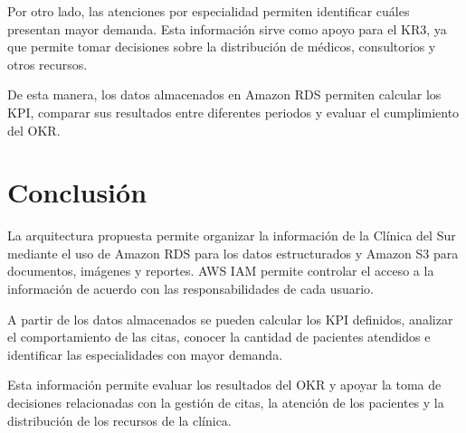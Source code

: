 \documentclass[11pt,letterpaper]{article}
\begin{document}
Por otro lado, las atenciones por especialidad permiten identificar cuáles presentan mayor demanda. Esta información sirve como apoyo para el KR3, 
ya que permite tomar decisiones sobre la distribución de médicos, consultorios y otros recursos.

De esta manera, los datos almacenados en Amazon RDS permiten calcular los KPI, comparar sus resultados entre diferentes periodos
y evaluar el cumplimiento del OKR.

\section{Conclusión}

La arquitectura propuesta permite organizar la información de la Clínica del Sur mediante el uso de Amazon RDS para los datos
estructurados y Amazon S3 para documentos, imágenes y reportes. AWS IAM permite controlar el acceso a la información de acuerdo con las responsabilidades de cada usuario.

A partir de los datos almacenados se pueden calcular los KPI definidos, analizar el comportamiento de las citas, 
conocer la cantidad de pacientes atendidos e identificar las especialidades con mayor demanda.

Esta información permite evaluar los resultados del OKR y apoyar la toma de decisiones relacionadas con la gestión de citas, 
la atención de los pacientes y la distribución de los recursos de la clínica.
\end{document}
